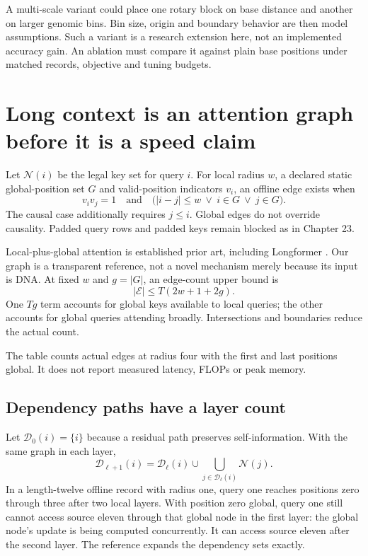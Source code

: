 A multi-scale variant could place one rotary block on base distance and another
on larger genomic bins. Bin size, origin and boundary behavior are then model
assumptions. Such a variant is a research extension here, not an implemented
accuracy gain. An ablation must compare it against plain base positions under
matched records, objective and tuning budgets.

\section{Long context is an attention graph before it is a speed claim}
Let $\mathcal N(i)$ be the legal key set for query $i$. For local radius $w$,
a declared static global-position set $G$ and valid-position indicators $v_i$,
an offline edge exists when
\[
v_iv_j=1
\quad\text{and}\quad
\bigl(|i-j|\le w\ \lor\ i\in G\ \lor\ j\in G\bigr).
\]
The causal case additionally requires $j\le i$.
Global edges do not override causality. Padded query rows and padded keys remain
blocked as in Chapter 23.

Local-plus-global attention is established prior art, including Longformer
\cite{evod24:longformer}. Our graph is a transparent reference, not a novel
mechanism merely because its input is DNA.
At fixed $w$ and $g=|G|$, an edge-count upper bound is
\[
|\mathcal E|\le T(2w+1+2g).
\]
One $Tg$ term accounts for global keys available to local queries; the other
accounts for global queries attending broadly. Intersections and boundaries
reduce the actual count.
\begin{center}\small\end{center}
The table counts actual edges at radius four with the first and last positions
global. It does not report measured latency, FLOPs or peak memory.


\subsection{Dependency paths have a layer count}
Let $\mathcal D_0(i)=\{i\}$ because a residual path preserves self-information.
With the same graph in each layer,
\[
\mathcal D_{\ell+1}(i)
=\mathcal D_\ell(i)\cup
 \bigcup_{j\in\mathcal D_\ell(i)}\mathcal N(j).
\]
In a length-twelve offline record with radius one, query one reaches positions
zero through three after two local layers. With position zero global, query one
still cannot access source eleven through that global node in the first layer:
the global node's update is being computed concurrently. It can access source
eleven after the second layer. The reference expands the dependency sets exactly.

